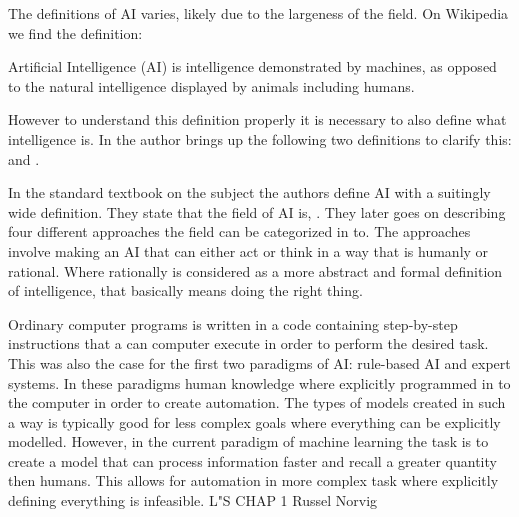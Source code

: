 \documentclass[12pt,A4]{report}
\theoremstyle{definition}
\begin{document}
The definitions of AI varies, likely due to the largeness of the field. On Wikipedia we find the definition\autocite{Wikipedia}:
\begin{displayquote}
Artificial Intelligence (AI) is intelligence demonstrated by machines, as opposed to the natural intelligence displayed by animals including humans.
\end{displayquote}
However to understand this definition properly it is necessary to also define what intelligence is. In \autocite{Tänkande Maskiner} the author brings up the following two definitions to clarify this:  and . 

In the standard textbook on the subject \autocite{Russel Norvig} the authors define AI with a suitingly wide definition. They state that the field of AI is, . They later goes on describing four different approaches the field can be categorized in to. The approaches involve making an AI that can either act or think in a way that is humanly or rational. Where rationally is considered as a more abstract and formal definition of intelligence, that basically means doing the right thing. 

Ordinary computer programs is written in a code containing step-by-step instructions that a can computer execute in order to perform the desired task. This was also the case for the first two paradigms of AI: rule-based AI and expert systems\autocite{K'lla}. In these paradigms human knowledge where explicitly programmed in to the computer in order to create automation. The types of models created in such a way is typically good for less complex goals where everything can be explicitly modelled. However, in the current paradigm of machine learning the task is to create a model that can process information faster and recall a greater quantity then humans\autocite{k'lla}. This allows for automation in more complex task where explicitly defining everything is infeasible. L"S CHAP 1 Russel Norvig
\end{document}

